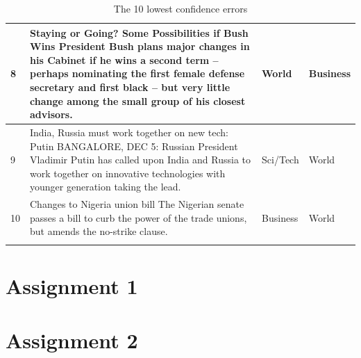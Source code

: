 \documentclass[12pt,a4paper,english]{article}
\begin{document}
\begin{table}[H]
\begin{longtable}{| m{2em} | m{25em} | m{5em} | m{5em} |}
        8 & Staying or Going? Some Possibilities if Bush Wins President Bush plans major changes in his Cabinet if he wins a second term -- perhaps nominating the first female defense secretary and first black -- but very little change among the small group of his closest advisors. & World & Business \\ \hline

        9 & India, Russia must work together on new tech: Putin BANGALORE, DEC 5: Russian President Vladimir Putin has called upon India and Russia to work together on innovative technologies with younger generation taking the lead. & Sci/Tech & World \\ \hline
        
        10 & Changes to Nigeria union bill The Nigerian senate passes a bill to curb the power of the trade unions, but amends the no-strike clause. & Business & World \\ \hline

\caption{The 10 lowest confidence errors}
\label{tab:misclassifications}
\end{longtable}
\end{table}


\section{Assignment 1}
\label{ap:ass1}
 
\section{Assignment 2}
\label{ap:ass2}
 

\newpage
\end{document}
